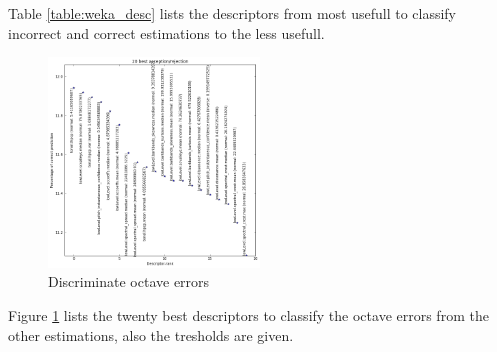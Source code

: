 \documentclass{proc}
\begin{document}
Table \ref{table:weka_desc} lists the descriptors from most usefull to classify incorrect and correct estimations to the less usefull.
\begin{figure}
    \centering
    \includegraphics[width=0.5\textwidth]{img/pnOct_descr.png}
    \caption{Discriminate octave errors}
    \label{fig:pnOct_desc}
\end{figure}
Figure \ref{fig:pnOct_desc} lists the twenty best descriptors to classify the octave errors from the other estimations, also the tresholds are given.
\end{document}
